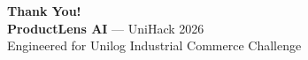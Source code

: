 \documentclass[aspectratio=169, 10pt]{beamer}
\begin{document}
\begin{frame}[plain]
  \begin{center}
    \Huge \textbf{Thank You!} \\
    \vspace{0.4cm}
    \Large \textbf{ProductLens AI} --- UniHack 2026 \\
    \vspace{0.2cm}
    \small Engineered for Unilog Industrial Commerce Challenge
  \end{center}
\end{frame}
\end{document}
